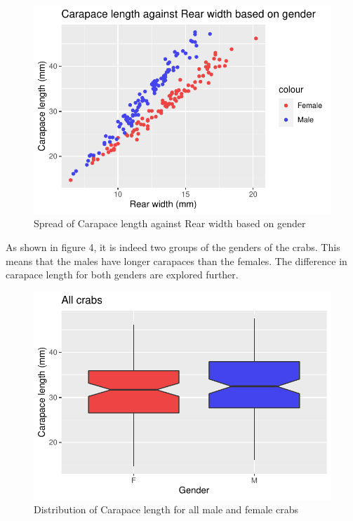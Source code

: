 \documentclass[
]{article}
\begin{document}
\begin{figure}[H]

{\centering \includegraphics{CrabProject_files/figure-latex/figure4-1} 

}

\caption{Spread of Carapace length against Rear width based on gender}\label{fig:figure4}
\end{figure}

As shown in figure 4, it is indeed two groups of the genders of the
crabs. This means that the males have longer carapaces than the females.
The difference in carapace length for both genders are explored further.

\begin{figure}[H]

{\centering \includegraphics{CrabProject_files/figure-latex/figure5-1} 

}

\caption{Distribution of Carapace length for all male and female crabs}\label{fig:figure5}
\end{figure}
\end{document}

